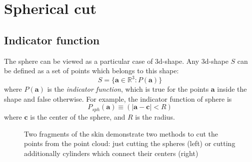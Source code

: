 \documentclass[12pt]{article}
\begin{document}
\section{Spherical cut}


\subsection{Indicator function}


The sphere can be viewed as a particular case of 3d-shape.
Any 3d-shape $S$ can be defined as a set of points which belongs to this shape:
\begin{equation}
    S = \{ \mathbf{a} \in \mathbb{R}^3 : P(\mathbf a) \}
\end{equation}
where $P(\mathbf a)$ is the \emph{indicator function}, which is true for the points $\mathbf a$ inside the shape and false otherwise. 
For example, the indicator function of sphere is 
\begin{equation}
  P_{sph}(\mathbf a) \equiv ( | \mathbf a - \mathbf c | < R )
\end{equation}
where $\mathbf c$ is the center of the sphere, and $R$ is the radius. 




\begin{figure}
\caption{Two fragments of the skin demonstrate two methods to cut the points from the point cloud: just cutting the spheres (left) or cutting additionally cylinders which connect their centers (right)}
\end{figure}
\end{document}
